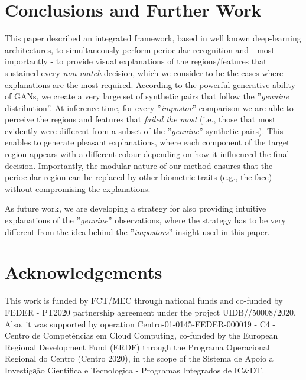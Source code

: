 \documentclass[final]{cvpr}
\begin{document}

\section{Conclusions and Further Work}
\label{sec:conclusions_and_further_work}
This paper described an integrated framework, based in well known deep-learning architectures, to simultaneously perform periocular recognition and - most importantly - to provide visual explanations of the regions/features that sustained every \emph{non-match} decision, which we consider to be the cases where explanations are the most required. According to the powerful generative ability of GANs, we create a very large set of synthetic pairs that follow the ''\emph{genuine} distribution''. At inference time, for every ''\emph{impostor}'' comparison we are able to perceive the regions and features that \emph{failed the most} (i.e., those that most evidently were different from a subset of the ''\emph{genuine}'' synthetic pairs). This enables to generate pleasant explanations, where each component of the target region appears with a different colour depending on how it influenced the final decision. Importantly, the modular nature of our method ensures that the periocular region can be replaced by other biometric traits (e.g., the face) without compromising the explanations. 

As future work, we are developing a strategy for also providing intuitive explanations of the ''\emph{genuine}'' observations, where the strategy has to be very different from the idea behind the ''\emph{impostors}'' insight used in this paper.

\section*{Acknowledgements}
This work is funded by FCT/MEC through national funds and co-funded by FEDER - PT2020 partnership agreement under the project UIDB//50008/2020. Also, it was supported by operation Centro-01-0145-FEDER-000019 - C4 - Centro de Compet\^encias em Cloud Computing, co-funded by the European Regional Development Fund (ERDF) through the Programa Operacional Regional do Centro (Centro 2020), in the scope of the Sistema de Apoio \´a Investiga̧\~{a}o Cient\´ifica e Tecnologica - Programas Integrados de IC\&DT.

{\small


}
\end{document}
